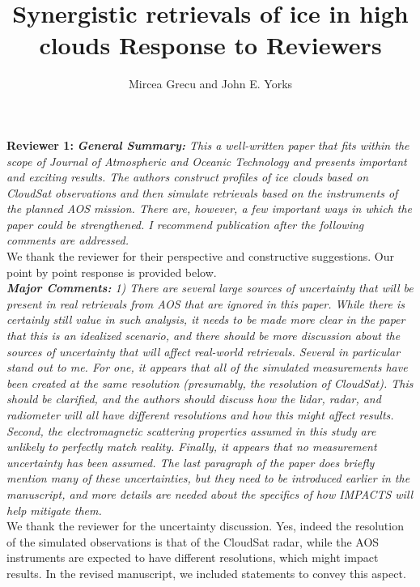 \documentclass[12pt]{article}
\author{Mircea Grecu and John E. Yorks}
\title{Synergistic retrievals of ice in high clouds
Response to Reviewers}
\date{}
\begin{document}
\maketitle


\noindent \textbf{Reviewer 1:}
\noindent\textit{ \textbf{General Summary:}
This a well-written paper that fits within the scope of Journal of Atmospheric and 
Oceanic Technology and presents important and exciting results. The authors construct
 profiles of ice clouds based on CloudSat observations and then simulate retrievals 
 based on the instruments of the planned AOS mission. There are, however, 
 a few important ways in which the paper could be strengthened. I recommend 
 publication after the following comments are addressed.}\\
\newline
 We thank the reviewer for their perspective and constructive suggestions. Our point by point response is 
 provided below.\\
\newline
\textit{\textbf{Major Comments:} 1) There are several large sources of uncertainty that will be present in real 
retrievals from AOS that are ignored in this paper. While there is certainly still 
value in such analysis, it needs to be made more clear in the paper that this is an 
idealized scenario, and there should be more discussion about the sources of 
uncertainty that will affect real-world retrievals. Several in particular stand 
out to me. For one, it appears that all of the simulated measurements have been 
created at the same resolution (presumably, the resolution of CloudSat). This
should be clarified, and the authors should discuss how the lidar, radar, and 
radiometer will all have different resolutions and how this might affect results. 
Second, the electromagnetic scattering properties assumed in this study are 
unlikely to perfectly match reality. Finally, it appears that no measurement 
uncertainty has been assumed. The last paragraph of the paper does briefly mention 
many of these uncertainties, but they need to be introduced earlier in the 
manuscript, and more details are needed about the specifics of how IMPACTS
will help mitigate them.}\\
\newline
We thank the reviewer for the uncertainty discussion. Yes, indeed the resolution of the simulated 
observations is that of the CloudSat radar, while the AOS instruments are expected to have different resolutions,
which might impact results. In the revised manuscript, we included statements to convey this aspect.
\end{document}
